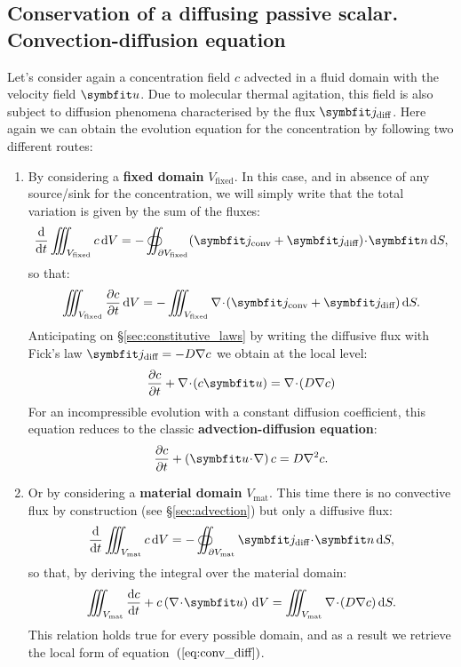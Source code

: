\subsection{Conservation of a diffusing passive scalar. Convection-diffusion equation}
Let's consider again a concentration field $c$ advected in a fluid domain with the velocity field $\bu$. Due to molecular thermal agitation, this field is also subject to diffusion phenomena characterised by the flux $\bj_\text{diff}$. Here again we can obtain the evolution equation for the concentration by following two different routes:
\begin{enumerate}
\item By considering a \textbf{fixed domain} $V_\text{fixed}$. In this case, and in absence of any source/sink for the concentration, we will simply write that the total variation is given by the sum of the fluxes:
$$
\dd{}{t} \iiint_{V_\text{fixed}} c \, \dV = - \oiint_{\partial V_\text{fixed}} (\bj_\text{conv} + \bj_\text{diff}) \!\cdot\!\bn\,\dS,
$$
so that: 
$$
\iiint_{V_\text{fixed}} \pd{c}{t} \, \dV = - \iiint_{V_\text{fixed}} \nabla \!\cdot\! (\bj_\text{conv} + \bj_\text{diff})\,\dS.
$$
Anticipating on \S \ref{sec:constitutive_laws} by writing the diffusive flux with Fick's law $\bj_\text{diff} = - D \nabla c$ we obtain at the local level:
\begin{equation}
\pd{c}{t} + \nabla \!\cdot\! \lp c\bu\rp = \nabla \!\cdot\! (D \nabla c) 
\label{eq:conv_diff}
\end{equation}
For an incompressible evolution with a constant diffusion coefficient, this equation reduces to the classic \textbf{advection-diffusion equation}:
\begin{equation}
\pd{c}{t} + \lp\bu\!\cdot\!\nabla\rp c = D \nabla^2 c.
\label{eq:conv_diff_incompressible}
\end{equation}
\item Or by considering a \textbf{material domain} $V_\text{mat}$. This time there is no convective flux by construction (see \S\ref{sec:advection}) but only a diffusive flux: 
$$
\dd{}{t} \iiint_{V_\text{mat}} c \, \dV = - \oiint_{\partial V_\text{mat}} \bj_\text{diff} \!\cdot\!\bn\,\dS,
$$
so that, by deriving the integral over the material domain:
$$
\iiint_{V_\text{mat}} \dd{c}{t} + c \lp\nabla\!\cdot\!\bu\rp \, \dV = \iiint_{V_\text{mat}} \nabla \!\cdot\! (D \nabla c)\,\dS.
$$
This relation holds true for every possible domain, and as a result we retrieve the local form of equation~$\left(\ref{eq:conv_diff}\right)$.
\end{enumerate}

